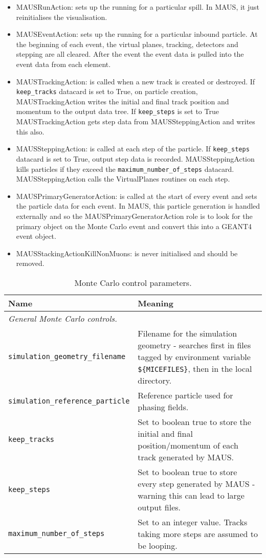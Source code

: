 \begin{itemize}
\item MAUSRunAction: sets up the running for a particular spill. In MAUS, it just reinitialises the visualisation.
\item MAUSEventAction: sets up the running for a particular inbound particle. At the beginning of each event, the virtual planes, tracking, detectors and stepping are all cleared. After the event the event data is pulled into the event data from each element.
\item MAUSTrackingAction: is called when a new track is created or destroyed. If \verb|keep_tracks| datacard is set to True, on particle creation, MAUSTrackingAction writes the initial and final track position and momentum to the output data tree. If \verb|keep_steps| is set to True MAUSTrackingAction gets step data from MAUSSteppingAction and writes this also.
\item MAUSSteppingAction: is called at each step of the particle. If \verb|keep_steps| datacard is set to True, output step data is recorded. MAUSSteppingAction kills particles if they exceed the \verb|maximum_number_of_steps| datacard. MAUSSteppingAction calls the VirtualPlanes routines on each step.
\item MAUSPrimaryGeneratorAction: is called at the start of every event and sets the particle data for each event. In MAUS, this particle generation is handled externally and so the MAUSPrimaryGeneratorAction role is to look for the primary object on the Monte Carlo event and convert this into a GEANT4 event object.
\item MAUSStackingActionKillNonMuons: is never initialised and should be removed.
\end{itemize}

\begin{table*}
\begin{center}
\caption{Monte Carlo control parameters.}
\begin{tabularx}{\textwidth}{lX}
Name & Meaning \\
\hline
\multicolumn{2}{l}{\emph{General Monte Carlo controls.}} \\
\hline
\verb|simulation_geometry_filename| & Filename for the simulation geometry - searches first in files tagged by environment variable \verb|${MICEFILES}|, then in the local directory.\\
\verb|simulation_reference_particle| & Reference particle used for phasing fields.\\
\verb|keep_tracks| & Set to boolean true to store the initial and final position/momentum of each track generated by MAUS.\\
\verb|keep_steps| & Set to boolean true to store every step generated by MAUS - warning this can lead to large output files.\\
\verb|maximum_number_of_steps| & Set to an integer value. Tracks taking more steps are assumed to be looping.\\
\end{tabularx}
\end{center}
\end{table*}


